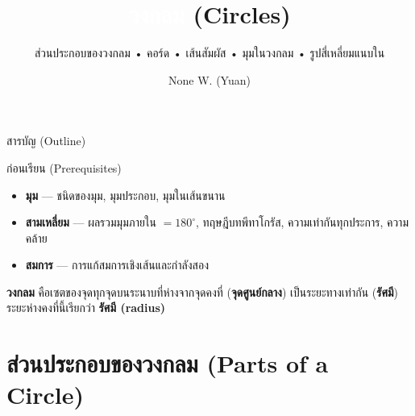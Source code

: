 \documentclass[11pt, aspectratio=169]{beamer}
\title[วงกลม]{\textcolor{white}{วงกลม} \textcolor{boxBlue!60}{(Circles)}}
\subtitle{ส่วนประกอบของวงกลม • คอร์ด • เส้นสัมผัส • มุมในวงกลม • รูปสี่เหลี่ยมแนบใน }
\author[None W. (Yuan)]{None W. (Yuan)}
\date{}
\begin{document}
\begin{frame}[plain]\titlepage\end{frame}
\begin{frame}{สารบัญ (Outline)}\tableofcontents\end{frame}

\begin{frame}{ก่อนเรียน (Prerequisites)}
  \begin{explanation}
    \begin{itemize}
      \item \textbf{มุม} — ชนิดของมุม, มุมประกอบ, มุมในเส้นขนาน
      \item \textbf{สามเหลี่ยม} — ผลรวมมุมภายใน $= 180^\circ$, ทฤษฎีบทพีทาโกรัส, ความเท่ากันทุกประการ, ความคล้าย
      \item \textbf{สมการ} — การแก้สมการเชิงเส้นและกำลังสอง
    \end{itemize}
  \end{explanation}

  \begin{intuition}
    \textbf{วงกลม} คือเซตของจุดทุกจุดบนระนาบที่ห่างจากจุดคงที่ (\textbf{จุดศูนย์กลาง}) เป็นระยะทางเท่ากัน (\textbf{รัศมี})
    ระยะห่างคงที่นี้เรียกว่า \textbf{รัศมี (radius)}
  \end{intuition}
\end{frame}

\section{ส่วนประกอบของวงกลม (Parts of a Circle)}
\end{document}
